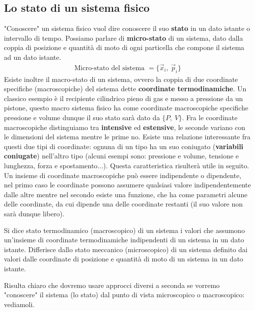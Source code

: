 \documentclass[
10pt, %
a4paper, %
oneside, %
headinclude,footinclude, %
BCOR5mm, %
]{scrartcl}
\begin{document}
\subsection{Lo stato di un sistema fisico}
"Conoscere" un sistema fisico vuol dire conoscere il suo \textbf{stato} in un dato istante o intervallo di tempo.
Possiamo parlare di \textbf{micro-stato} di un sistema, dato dalla coppia di posizione e quantità di moto di ogni particella che compone il sistema ad un dato istante. 
\begin{align*} 
	\text{Micro-stato del sistema } = \{ \vec{x}_i,\ \vec{p}_i\}
\end{align*} 
Esiste inoltre il macro-stato di un sistema, ovvero la coppia di due coordinate specifiche (macroscopiche) del sistema dette \textbf{coordinate termodinamiche}. Un classico esempio è il recipiente cilindrico pieno di gas e messo a pressione da un pistone, questo macro sistema fisico ha come coordinate macroscopiche specifiche pressione e volume dunque il suo stato sarà dato da $\{P,\ V\}$. Fra le coordinate macroscopiche distinguiamo tra \textbf{intensive} ed \textbf{estensive}, le seconde variano con le dimensioni del sistema mentre le prime no. Esiste una relazione interessante fra questi due tipi di coordinate: ognuna di un tipo ha un suo coniugato (\textbf{variabili coniugate}) nell'altro tipo (alcuni esempi sono: pressione e volume, tensione e lunghezza, forza e spostamento...). Questa caratteristica risulterà utile in seguito.\\
Un insieme di coordinate macroscopiche può essere indipendente o dipendente, nel primo caso le coordinate possono assumere qualsiasi valore indipendentemente dalle altre mentre nel secondo esiste una funzione, che ha come parametri alcune delle coordinate, da cui dipende una delle coordinate restanti (il suo valore non sarà dunque libero). 
\begin{definition}
	Si dice stato termodinamico (macroscopico) di un sistema i valori che assumono un'insieme di coordinate termodinamiche indipendenti di un sistema in un dato istante. Differisce dallo stato meccanico (microscopico) di un sistema definito dai valori dalle coordinate di posizione e quantità di moto di un sistema in un dato istante. 
\end{definition}
Risulta chiaro che dovremo usare approcci diversi a seconda se vorremo "conoscere" il sistema (lo stato) dal punto di vista microscopico o macroscopico: vediamoli. 
\end{document}
